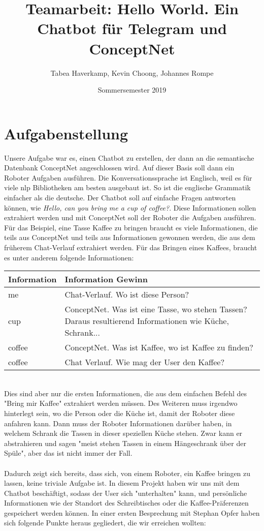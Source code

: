 \documentclass[12pt]{article}
\title{Teamarbeit: Hello World. Ein Chatbot für Telegram und ConceptNet}
\author{Tabea Haverkamp, Kevin Choong, Johannes Rompe}
\date{Sommersemester 2019}
\begin{document}
\maketitle

\cleardoublepage
\tableofcontents 

\clearpage

\section{Aufgabenstellung}
Unsere Aufgabe war es, einen Chatbot zu erstellen, der dann an die semantische Datenbank ConceptNet angeschlossen wird. Auf dieser Basis soll dann ein Roboter Aufgaben ausführen.
 Die Konversationssprache ist Englisch, weil es für viele \ac{nlp} Bibliotheken am besten ausgebaut ist. So ist die englische Grammatik einfacher als die deutsche. Der Chatbot soll auf einfache Fragen antworten können, wie \textit{Hello, can you bring me a cup of coffee?}. Diese Informationen sollen extrahiert werden und mit ConceptNet soll der Roboter die Aufgaben ausführen. Für das Beispiel, eine Tasse Kaffee zu bringen braucht es viele Informationen, die teils aus ConceptNet und teils aus Informationen gewonnen werden, die aus dem früherem Chat-Verlauf extrahiert werden. Für das Bringen eines Kaffees, braucht es unter anderem folgende Informationen: \\


\begin{tabular}{p{3cm}|p{10cm}}%
 
Information & Information Gewinn \\
\hline
 
me & Chat-Verlauf. Wo ist diese Person? \\
 
cup & ConceptNet. Was ist eine Tasse, wo stehen Tassen? Daraus resultierend Informationen wie Küche, Schrank...\\
coffee & ConceptNet. Was ist Kaffee, wo ist Kaffee zu finden? \\
coffee & Chat Verlauf. Wie mag der User den Kaffee?
 
\end{tabular} \\

Dies sind aber nur die ersten Informationen, die aus dem einfachen Befehl des "Bring mir Kaffee" extrahiert werden müssen. Des Weiteren muss irgendwo hinterlegt sein, wo die Person oder die Küche ist, damit der Roboter diese anfahren kann. Dann muss der Roboter Informationen darüber haben, in welchem Schrank die Tassen in dieser speziellen Küche stehen. Zwar kann er abstrahieren und sagen "meist stehen Tassen in einem Hängeschrank über der Spüle", aber das ist nicht immer der Fall.
\\ \\
Dadurch zeigt sich bereits, dass sich, von einem Roboter, ein Kaffee bringen zu lassen, keine triviale Aufgabe ist. In diesem Projekt haben wir uns mit dem Chatbot beschäftigt, sodass der  User sich "unterhalten" kann, und persönliche Informationen wie der Standort des Schreibtisches oder die Kaffee-Präferenzen gespeichert werden können. In einer ersten Besprechung mit Stephan Opfer haben sich folgende Punkte heraus gegliedert, die wir erreichen wollten:
\end{document}

